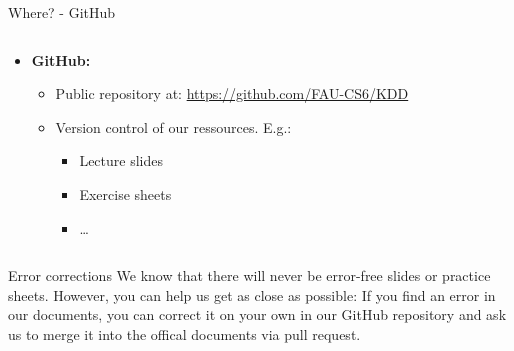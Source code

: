 \begin{frame}{Where? - GitHub}
	\begin{columns}
		\begin{column}{0.7\textwidth}
			\begin{itemize}
				\item \textbf{GitHub:}
				      \begin{itemize}
					      \item Public repository at: \url{https://github.com/FAU-CS6/KDD}
					      \item Version control of our ressources. E.g.:
					            \begin{itemize}
						            \item Lecture slides
						            \item Exercise sheets
						            \item \ldots
					            \end{itemize}
				      \end{itemize}
			\end{itemize}
		\end{column}
		\begin{column}{0.3\textwidth}
			\begin{center}
			\end{center}
		\end{column}
	\end{columns}
	\vspace{5mm}
	\begin{block}{Error corrections}
		We know that there will never be error-free slides or practice sheets. However, you can help us get as close as possible: If you find an error in our documents, you can correct it on your own in our GitHub repository and ask us to merge it into the offical documents via pull request.
	\end{block}

\end{frame}
